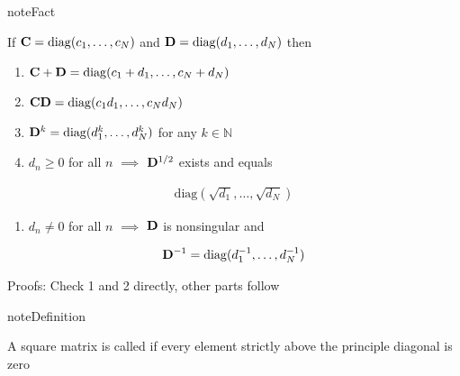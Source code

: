 \documentclass[letterpaper,10pt,english]{jupyterBook}
\begin{document}
\begin{sphinxadmonition}{note}{Fact}

\sphinxAtStartPar
If \({\bf C} = \mathrm{diag}(c_1, \ldots, c_N)\) and \({\bf D} = \mathrm{diag}(d_1, \ldots,d_N)\) then
\begin{enumerate}
%
\item {} 
\sphinxAtStartPar
\({\bf C} + {\bf D} = \mathrm{diag}(c_1 + d_1, \ldots, c_N + d_N)\)

\item {} 
\sphinxAtStartPar
\({\bf C} {\bf D} = \mathrm{diag}(c_1 d_1, \ldots, c_N d_N)\)

\item {} 
\sphinxAtStartPar
\({\bf D}^k = \mathrm{diag}(d^k_1, \ldots, d^k_N)\) for any \(k \in \mathbb{N}\)

\item {} 
\sphinxAtStartPar
\(d_n \geq 0\) for all \(n\) \(\implies\) \({\bf D}^{1/2}\) exists and equals

\end{enumerate}
\begin{equation*}
\begin{split}\mathrm{diag}(\sqrt{d_1}, \ldots, \sqrt{d_N})\end{split}
\end{equation*}\begin{enumerate}
%
\setcounter{enumi}{4}
\item {} 
\sphinxAtStartPar
\(d_n \ne 0\) for all \(n\) \(\implies\) \({\bf D}\) is nonsingular and

\end{enumerate}
\begin{equation*}
\begin{split}{\bf D}^{-1} = \mathrm{diag}(d_1^{-1}, \ldots, d_N^{-1})\end{split}
\end{equation*}\end{sphinxadmonition}

\sphinxAtStartPar
Proofs: Check 1 and 2 directly, other parts follow

\begin{sphinxadmonition}{note}{Definition}

\sphinxAtStartPar
A square matrix is called  if every element strictly above the principle diagonal is zero
\end{sphinxadmonition}
\end{document}
